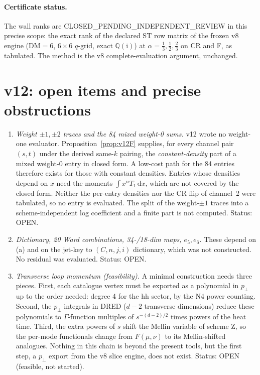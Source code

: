 \documentclass[11pt,a4paper]{article}
\newcommand{\ii}{\mathrm i}
\newcommand{\OPEN}{\textsf{OPEN}}
\newcommand{\CPIR}{\textsf{CLOSED\_PENDING\_}\allowbreak\textsf{INDEPENDENT\_REVIEW}}
\theoremstyle{plain}
\theoremstyle{definition}
\theoremstyle{remark}
\numberwithin{equation}{section}
\begin{document}
\paragraph{Certificate status.} The wall ranks are
\CPIR{} in this precise scope: the exact rank of the declared ST row
matrix of the frozen v8 engine (\(\mathrm{DM}=6\), \(6\times6\)
\(q\)-grid, exact \(\mathbb Q(\ii)\)) at \(\alpha=\tfrac13,\tfrac12,\tfrac23\)
on CR and F, as tabulated. The method is the v8 complete-evaluation
argument, unchanged.

\section{v12: open items and precise obstructions}
\label{sec:v12open}

\begin{enumerate}[label=(\alph*)]
\item \emph{Weight \(\pm1,\pm2\) traces and the 84 mixed weight-0
sums.} v12 wrote no weight-one evaluator. Proposition~\ref{prop:v12F}
supplies, for every channel pair \((s,t)\) under the derived same-\(k\)
pairing, the \emph{constant-density} part of a mixed weight-0 entry
in closed form. A low-cost path for the 84 entries therefore exists
for those with constant densities. Entries whose densities depend on
\(x\) need the moments \(\int x^nT_1\,\mathrm dx\), which are not
covered by the closed form. Neither the per-entry densities nor the
CR flip of channel~2 were tabulated, so no entry is evaluated. The
split of the weight-\(\pm1\) traces into a scheme-independent log
coefficient and a finite part is not computed. Status: \OPEN.
\item \emph{Dictionary, 20 Ward combinations, 34-/18-dim maps,
\(e_5,e_6\).} These depend on (a) and on the jet-key to \((C,n,j,i)\)
dictionary, which was not constructed. No residual was evaluated.
Status: \OPEN.
\item \emph{Transverse loop momentum (feasibility).} A minimal
construction needs three pieces. First, each catalogue vertex must
be exported as a polynomial in \(p_\perp\) up to the order needed:
degree 4 for the hh sector, by the N4 power counting. Second, the
\(p_\perp\) integrals in DRED (\(d-2\) transverse dimensions) reduce
these polynomials to \(\Gamma\)-function multiples of
\(s^{-(d-2)/2}\) times powers of the heat time. Third, the extra
powers of \(s\) shift the Mellin variable of scheme Z, so the
per-mode functionals change from \(F(\mu,\nu)\) to its Mellin-shifted
analogues. Nothing in this chain is beyond the present tools, but the
first step, a \(p_\perp\) export from the v8 slice engine, does not
exist. Status: \OPEN{} (feasible, not started).
\end{enumerate}
\end{document}
